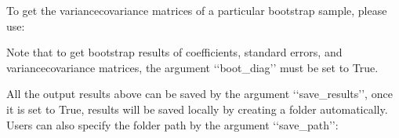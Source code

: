 \documentclass[letterpaper,10pt,english]{sphinxmanual}
\begin{document}
\begin{itemize}
\begin{quote}
\begin{sphinxVerbatim}[commandchars=\\\{\}]
            
  \PYG{p}{[}\PYG{p}{]}
\end{sphinxVerbatim}
\end{quote}

\sphinxAtStartPar
To get the variance\sphinxhyphen{}covariance matrices of a particular bootstrap sample, please use:
\begin{quote}

\begin{sphinxVerbatim}[commandchars=\\\{\}]
\PYG{p}{[}\PYG{p}{]}\PYG{p}{[}\PYG{p}{]}
\end{sphinxVerbatim}
\end{quote}

\end{itemize}

\sphinxAtStartPar
Note that to get bootstrap results of coefficients, standard errors, and variance\sphinxhyphen{}covariance matrices, the argument
‘‘boot\_diag’’ must be set to True.

\sphinxAtStartPar
All the output results above can be saved by the argument ‘‘save\_results’’, once it is set to True,
results will be saved locally by creating a folder automatically. Users can also specify the folder path by the
argument ‘‘save\_path’’:
\begin{quote}

\begin{sphinxVerbatim}[commandchars=\\\{\}]
         
\end{sphinxVerbatim}
\end{quote}
\end{document}
